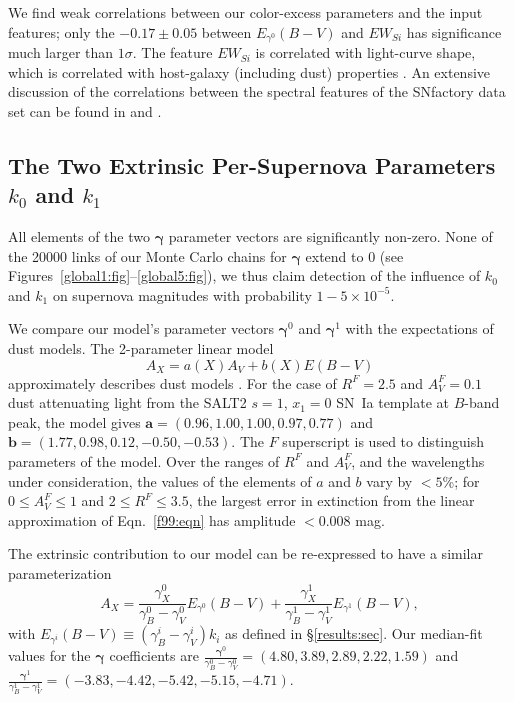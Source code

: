 \documentclass{aastex61}   	%
\begin{document}
We find weak correlations between our color-excess parameters and the input features; 
only the $ -0.17 \pm 0.05$ between $E_{\gamma^0}(B-V)$ and $EW_{Si}$ has significance much larger than $1 \sigma$.
The feature $EW_{Si}$ is correlated with light-curve shape, which is correlated with host-galaxy (including dust) properties 
\citep{2000AJ....120.1479H, 2003MNRAS.340.1057S}.
An extensive discussion of the correlations between the spectral features of the SNfactory data set can be found in \citet{chotard:thesis}
and \citet{leget:thesis}.

\subsection{The Two Extrinsic Per-Supernova Parameters $k_0$ and $k_1$}
All elements of the two $\pmb{\gamma}$ parameter vectors  are significantly non-zero. 
None of the 20000 links of 
our Monte Carlo chains for $\pmb{\gamma}$ extend to 0 (see Figures~\ref{global1:fig}--\ref{global5:fig}), we thus claim detection of the
influence of $k_0$ and $k_1$  on supernova magnitudes
with probability $1-5\times 10^{-5}$.

We compare our model's parameter vectors $\pmb{\gamma}^0$ and $\pmb{\gamma}^1$ with the expectations of  dust models.
The 2-parameter linear model
\begin{equation}
A_X = a(X)  A_V + b(X) E(B-V)
\label{f99:eqn}
\end{equation}
approximately describes dust models \citep[for example, the wavelength dependent model of ][is linear,
though its linearity is lost when integrated over broad-band filters]{1989ApJ...345..245C}.
For the case of
$R^F=2.5$ and $A^F_V=0.1$ dust attenuating light from the SALT2
\citep{2007A&A...466...11G} $s=1$, $x_1=0$ SN~Ia template at $B$-band peak, the  model
gives
$\mathbf{a} = (0.96,   1.00,   1.00,   0.97,   0.77)$ and $\mathbf{b}=(  1.77,   0.98,   0.12,  -0.50,  -0.53)$.
The $F$ superscript is used to distinguish parameters of the  model.
Over the ranges of
 $R^F$ and $A^F_V$,
and the wavelengths under consideration,  the values of the elements of $a$ and $b$ vary by $<5$\%;
for $0\le A^F_V\le 1$ and $2 \le R^F \le 3.5$, the largest error in extinction from the linear approximation of
Eqn.~\ref{f99:eqn} has amplitude $<0.008$ mag.

The extrinsic contribution to our model can be re-expressed to have a similar parameterization
\begin{equation}
A_X = \frac{\gamma^0_X}{\gamma^0_B-\gamma^0_V}  E_{\gamma^0}(B-V) +  \frac{\gamma^1_X}{\gamma^1_B-\gamma^1_V}  E_{\gamma^1}(B-V),
\end{equation}
with $E_{\gamma^i}(B-V) \equiv  (\gamma^i_B-\gamma^i_V)k_i$ as defined in \S\ref{results:sec}.
Our median-fit values for the $\pmb{\gamma}$ coefficients are
$\frac{\pmb{\gamma}^0}{\gamma^0_B-\gamma^0_V}  =(4.80 ,   3.89,   2.89,   2.22,   1.59)$ and
$ \frac{\pmb{\gamma}^1}{\gamma^1_B-\gamma^1_V}=(-3.83 ,  -4.42,  -5.42,  -5.15,  -4.71)$.
\end{document}
